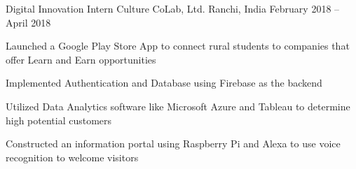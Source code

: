 \begin{cventries}
	
	\vspace{-2mm}
	\cventry
	{Digital Innovation Intern}
	{Culture CoLab, Ltd.}
	{Ranchi, India}
	{February 2018 – April 2018}
	{\begin{cvitems}
		\item {Launched a Google Play Store App to connect rural students to companies that offer Learn and Earn opportunities}
		\item {Implemented Authentication and Database using Firebase as the backend}
		\item {Utilized Data Analytics software like Microsoft Azure and Tableau to determine high potential customers}
		\item {Constructed an information portal using Raspberry Pi and Alexa to use voice recognition to welcome visitors}
		\end{cvitems}}

\end{cventries}
